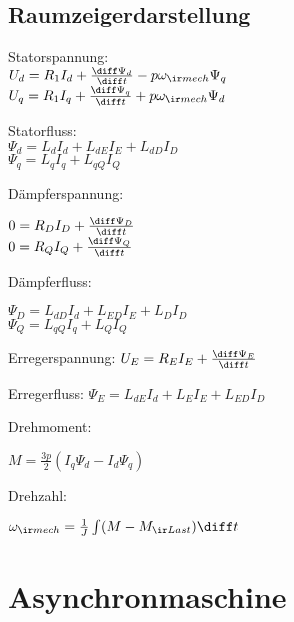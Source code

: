\documentclass[fs, german]{latex4ei_fs}
\begin{document}
\begin{sectionbox}
\subsection{Raumzeigerdarstellung}
Statorspannung:\\
$U_d = R_1 I_d + \frac{\diff \Psi_d}{\diff t} - p \omega_{\ir mech} \Psi_q$\\
$U_q = R_1 I_q + \frac{\diff \Psi_q}{\diff t} + p \omega_{\ir mech} \Psi_d$

Statorfluss: \\
$\Psi_d = L_d I_d + L_{dE} I_E + L_{dD} I_D$ \\
$\Psi_q = L_q I_q +  L_{qQ} I_Q$


Dämpferspannung:

$0 = R_D I_D + \frac{\diff \Psi_D}{\diff t}$ \\
$0 = R_Q I_Q + \frac{\diff \Psi_Q}{\diff t}$

Dämpferfluss:

$\Psi_D = L_{dD} I_d + L_{ED} I_E + L_D I_D$ \\
$\Psi_Q = L_{qQ} I_q + L_{Q} I_{Q}$

Erregerspannung:
$U_E = R_E I_E + \frac{\diff \Psi_E}{\diff t}$

Erregerfluss:
$\Psi_E = L_{dE} I_d + L_E I_E + L_{ED} I_D$

Drehmoment:

$M = \frac{3 p}{2} (I_q \Psi_d - I_d \Psi_q)$

Drehzahl:

$\omega_{\ir mech} = \frac{1}{J} \int (M- M_{\ir Last}) \diff t$

 
 \end{sectionbox} 

 \section{Asynchronmaschine}
\end{document}
